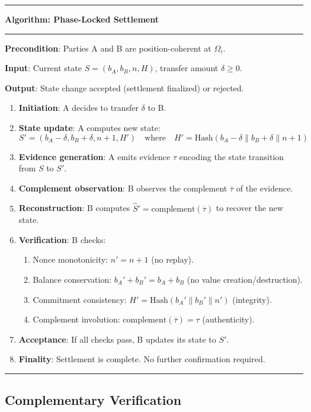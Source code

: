 \documentclass[twocolumn,10pt,a4paper]{article}
\theoremstyle{plain}
\theoremstyle{definition}
\newcommand{\comp}[1]{\overline{#1}}
\newenvironment{algo}[1]
  {\par\medskip\noindent\rule{\linewidth}{0.8pt}\par\nobreak\smallskip
   \noindent\textbf{Algorithm: #1}\par\nobreak\smallskip
   \noindent\rule{\linewidth}{0.4pt}\par\nobreak\smallskip}
  {\par\smallskip\noindent\rule{\linewidth}{0.8pt}\par\medskip}
\begin{document}
\begin{algo}{Phase-Locked Settlement}

\textbf{Precondition}: Parties A and B are position-coherent at $\Omega_i$.

\textbf{Input}: Current state $S = (b_A, b_B, n, H)$, transfer amount $\delta \geq 0$.

\textbf{Output}: State change accepted (settlement finalized) or rejected.

\begin{enumerate}
\item \textbf{Initiation}: A decides to transfer $\delta$ to B.
\item \textbf{State update}: A computes new state:
  \[
  S' = (b_A - \delta, b_B + \delta, n+1, H')
  \quad \text{where} \quad H' = \mathrm{Hash}(b_A - \delta \| b_B + \delta \| n+1)
  \]
\item \textbf{Evidence generation}: A emits evidence $\tau$ encoding the state transition from $S$ to $S'$.
\item \textbf{Complement observation}: B observes the complement $\comp{\tau}$ of the evidence.
\item \textbf{Reconstruction}: B computes $\hat{S}' = \mathrm{complement}(\comp{\tau})$ to recover the new state.
\item \textbf{Verification}: B checks:
  \begin{enumerate}
  \item Nonce monotonicity: $n' = n + 1$ (no replay).
  \item Balance conservation: $b_A' + b_B' = b_A + b_B$ (no value creation/destruction).
  \item Commitment consistency: $H' = \mathrm{Hash}(b_A' \| b_B' \| n')$ (integrity).
  \item Complement involution: $\mathrm{complement}(\comp{\tau}) = \tau$ (authenticity).
  \end{enumerate}
\item \textbf{Acceptance}: If all checks pass, B updates its state to $S'$.
\item \textbf{Finality}: Settlement is complete. No further confirmation required.
\end{enumerate}
\end{algo}

\subsection{Complementary Verification}
\end{document}
